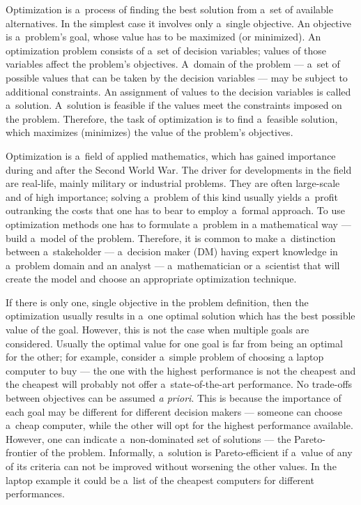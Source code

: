 Optimization is a~process of finding the best solution from a~set of available
alternatives. In the simplest case it involves only a~single objective. An
objective is a~problem's goal, whose value has to be maximized (or
minimized). An optimization problem consists of a~set of decision variables;
values of those variables affect the problem's objectives. A~domain of the
problem --- a~set of possible values that can be taken by the decision
variables --- may be subject to additional constraints. An assignment of
values to the decision variables is called a~solution. A~solution is feasible
if the values meet the constraints imposed on the problem. Therefore, the task
of optimization is to find a~feasible solution, which maximizes (minimizes)
the value of the problem's objectives.

Optimization is a~field of applied mathematics, which has gained importance
during and after the Second World War. The driver for developments in the
field are real-life, mainly military or industrial problems. They are often
large-scale and of high importance; solving a~problem of this kind usually
yields a~profit outranking the costs that one has to bear to employ a~formal
approach. To use optimization methods one has to formulate a~problem in a
mathematical way --- build a~model of the problem. Therefore, it is common to
make a~distinction between a~stakeholder --- a~decision maker (DM) having
expert knowledge in a~problem domain and an analyst --- a~mathematician or
a~scientist that will create the model and choose an appropriate optimization
technique.

If there is only one, single objective in the problem definition, then the
optimization usually results in a~one optimal solution which has the best
possible value of the goal. However, this is not the case when multiple goals
are considered. Usually the optimal value for one goal is far from being an
optimal for the other; for example, consider a~simple problem of choosing a
laptop computer to buy --- the one with the highest performance is not the
cheapest and the cheapest will probably not offer a~state-of-the-art
performance. No trade-offs between objectives can be assumed \textit{a
  priori}. This is because the importance of each goal may be different for
different decision makers --- someone can choose a~cheap computer, while the
other will opt for the highest performance available. However, one can
indicate a~non-dominated set of solutions --- the Pareto-frontier of the
problem. Informally, a~solution is Pareto-efficient if a~value of any of its
criteria can not be improved without worsening the other values. In the laptop
example it could be a~list of the cheapest computers for different
performances.

